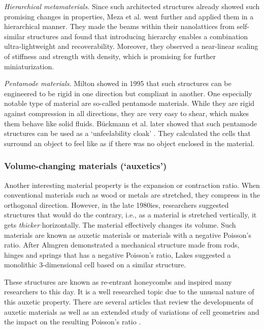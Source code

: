{\textit{Hierarchical metamaterials. } Since such architected structures already showed such promising changes in properties, Meza et al. \cite{Meza2015} went further and applied them in a hierarchical manner. They made the beams within their nanolattices from self-similar structures and found that introducing hierarchy enables a combination ultra-lightweight and recoverability. Moreover, they observed a near-linear scaling of stiffness and strength with density, which is promising for further miniaturization.

\textit{Pentamode materials. } Milton \cite{Milton1995b} showed in 1995 that such structures can be engineered to be rigid in one direction but compliant in another. One especially notable type of material are so-called pentamode materials. While they are rigid against compression in all directions, they are very easy to shear, which makes them behave like solid fluids. Bückmann et al. later showed that such pentamode structures can be used as a `unfeelability cloak' \cite{Buckmann2014, Buckmann2015a}. They calculated the cells that surround an object to feel like as if there was no object enclosed in the material.



\subsubsection{Volume-changing materials (`auxetics')}

Another interesting material property is the expansion or contraction ratio. When conventional materials such as wood or metals are stretched, they compress in the orthogonal direction. However, in the late 1980ies, researchers suggested structures that would do the contrary, i.e., as a material is stretched vertically, it gets \textit{thicker} horizontally. The material effectively changes its volume. Such materials are known as auxetic materials or materials with a negative Poisson's ratio. After Almgren \cite{Almgren1985} demonstrated a mechanical structure made from rods, hinges and springs that has a negative Poisson's ratio, Lakes \cite{Lakes1987} suggested a monolithic 3-dimensional cell based on a similar structure.  


These structures are known as re-entrant honeycombs and inspired many researchers to this day. It is a well researched topic due to the unusual nature of this auxetic property. There are several articles that review the developments of auxetic materials \cite{Ren2018, Kolken2017, Saxena2016, Christensen2015, Mir2014a} as well as an extended study of variations of cell geometries and the impact on the resulting Poisson's ratio \cite{AlvarezElipe2012}.

}
